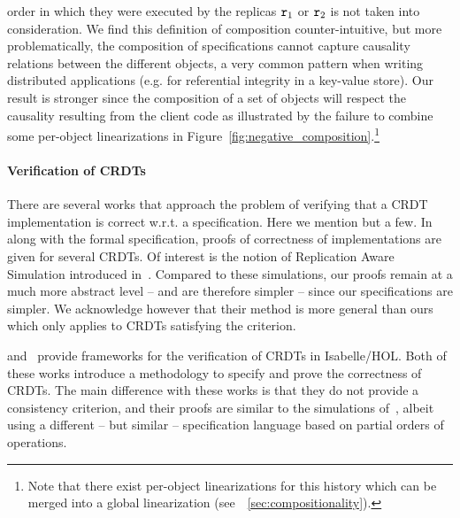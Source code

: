 \begin{inparaenum}
  order in which they were executed by the replicas $\mathtt{r}_1$ or $\mathtt{r}_2$
  is not taken into consideration.
  We find this definition of composition counter-intuitive, but more
  problematically, the composition of specifications cannot capture
  causality relations between the different objects, a very common
  pattern when writing distributed applications (e.g. for referential
  integrity in a key-value store).
  Our result is stronger since the composition of a set of  
  objects will respect the causality resulting from the client code as
  illustrated by the failure to combine some per-object linearizations 
  in Figure~\ref{fig:negative_composition}.\footnote{Note that there
    exist per-object linearizations for this history which can be merged into a global linearization (see~\sectionautorefname~\ref{sec:compositionality}).}
\end{inparaenum}

\paragraph{Verification of CRDTs}
There are several works that approach the problem of verifying that a
CRDT implementation is correct w.r.t. a specification.
%
Here we mention but a few.
%
In~\cite{BurckhardtGYZ14, AttiyaBGMYZ16, Burckhardt14} along with the
formal specification, proofs of correctness of implementations are
given for several CRDTs.
%
Of interest is the notion of Replication Aware Simulation introduced
in~\cite{BurckhardtGYZ14}.
%
Compared to these simulations, our proofs remain at a much more
abstract level -- and are therefore simpler -- since our
specifications are simpler.
%
We acknowledge however that their method is more general than ours
which only applies to CRDTs satisfying the \CRDTLinshort{} criterion.

\citet{ZellerBP14} and~\citet{GomesKMB17} provide frameworks for the
verification of CRDTs in Isabelle/HOL\@.
%
Both of these works introduce a methodology to specify and prove the
correctness of CRDTs.
%
The main difference with these works is that they do not provide a
consistency criterion, and their proofs are similar to the simulations
of~\cite{BurckhardtGYZ14}, albeit using a different -- but similar
-- specification language based on partial orders of operations.


